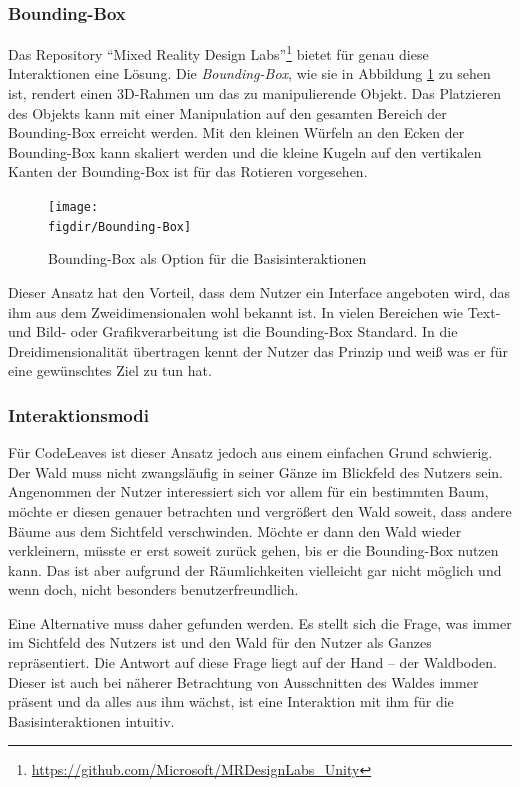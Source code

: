 \subsubsection*{Bounding-Box}

Das Repository "`Mixed Reality Design Labs"'\footnote{\url{https://github.com/Microsoft/MRDesignLabs_Unity}} bietet für genau diese Interaktionen eine Lösung. Die \textit{Bounding-Box}, wie sie in Abbildung \ref{fig:Bounding-Box} zu sehen ist, rendert einen 3D-Rahmen um das zu manipulierende Objekt. Das Platzieren des Objekts kann mit einer Manipulation auf den gesamten Bereich der Bounding-Box erreicht werden. Mit den kleinen Würfeln an den Ecken der Bounding-Box kann skaliert werden und die kleine Kugeln auf den vertikalen Kanten der Bounding-Box ist für das Rotieren vorgesehen.

\begin{figure}[htb]
  \texttt{[image: \\figdir/Bounding-Box]}
  \caption{Bounding-Box als Option für die Basisinteraktionen \cite{microsoft2017mixed}}
  \label{fig:Bounding-Box}
\end{figure}

Dieser Ansatz hat den Vorteil, dass dem Nutzer ein Interface angeboten wird, das ihm aus dem Zweidimensionalen wohl bekannt ist. In vielen Bereichen wie Text- und Bild- oder Grafikverarbeitung ist die Bounding-Box Standard. In die Dreidimensionalität übertragen kennt der Nutzer das Prinzip und weiß was er für eine gewünschtes Ziel zu tun hat.

\subsubsection*{Interaktionsmodi}

Für CodeLeaves ist dieser Ansatz jedoch aus einem einfachen Grund schwierig. Der Wald muss nicht zwangsläufig in seiner Gänze im Blickfeld des Nutzers sein. Angenommen der Nutzer interessiert sich vor allem für ein bestimmten Baum, möchte er diesen genauer betrachten und vergrößert den Wald soweit, dass andere Bäume aus dem Sichtfeld verschwinden. Möchte er dann den Wald wieder verkleinern, müsste er erst soweit zurück gehen, bis er die Bounding-Box nutzen kann. Das ist aber aufgrund der Räumlichkeiten vielleicht gar nicht möglich und wenn doch, nicht besonders benutzerfreundlich.

Eine Alternative muss daher gefunden werden. Es stellt sich die Frage, was immer im Sichtfeld des Nutzers ist und den Wald für den Nutzer als Ganzes repräsentiert. Die Antwort auf diese Frage liegt auf der Hand -- der Waldboden. Dieser ist auch bei näherer Betrachtung von Ausschnitten des Waldes immer präsent und da alles aus ihm wächst, ist eine Interaktion mit ihm für die Basisinteraktionen intuitiv.

